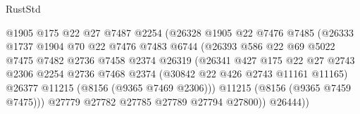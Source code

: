 \begin{lexlean}{RustStd}
\begin{coremodule}
{\begin{coremodule}
{{{{{{{{{{{{{{{{{{{{{{{{{{{{{{{{{{                                    @1905
                                    @175
                                    @22
                                    @27
                                    @7487
                                    @2254
                                    (@26328
                                      @1905
                                      @22
                                      @7476
                                      @7485
                                      (@26333
                                        @1737
                                        @1904
                                        @70
                                        @22
                                        @7476
                                        @7483
                                        @6744
                                        (@26393
                                          @586
                                          @22
                                          @69
                                          @5022
                                          @7475
                                          @7482
                                          @2736
                                          @7458
                                          @2374
                                          @26319
                                          (@26341
                                            @427
                                            @175
                                            @22
                                            @27
                                            @2743
                                            @2306
                                            @2254
                                            @2736
                                            @7468
                                            @2374
                                            (@30842 @22 @426 @2743 @11161 @11165)
                                            @26377
                                            @11215
                                            (@8156 (@9365 @7469 @2306)))
                                          @11215
                                          (@8156 (@9365 @7459 @7475)))
                                        @27779
                                        @27782
                                        @27785
                                        @27789
                                        @27794
                                        @27800))
                                    @26444))
}}}}}}}}}}}}}}}}}}}}}}}}}}}}}}}}}}
\end{coremodule}}
\end{coremodule}
\end{lexlean}
